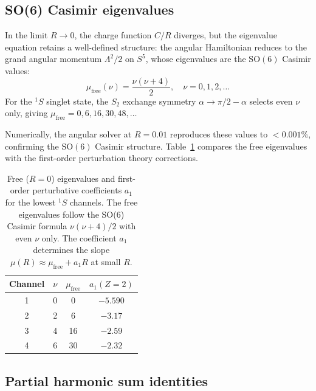 \documentclass[aps,pra,twocolumn,superscriptaddress,longbibliography]{revtex4-2}
\begin{document}
\subsection{SO(6) Casimir eigenvalues}
\label{sec:casimir}

In the limit $R \to 0$, the charge function $C/R$ diverges, but
the eigenvalue equation retains a well-defined structure: the
angular Hamiltonian reduces to the grand angular momentum
$\Lambda^2/2$ on $S^5$, whose eigenvalues are the $\mathrm{SO}(6)$
Casimir values:
\begin{equation}
  \mu_{\mathrm{free}}(\nu) = \frac{\nu(\nu + 4)}{2},
  \quad \nu = 0, 1, 2, \ldots
  \label{eq:mu_free}
\end{equation}
For the ${}^1S$ singlet state, the $S_2$ exchange symmetry
$\alpha \to \pi/2 - \alpha$ selects even $\nu$ only, giving
$\mu_{\mathrm{free}} = 0, 6, 16, 30, 48, \ldots$

Numerically, the angular solver at $R = 0.01$ reproduces these
values to $< 0.001\%$, confirming the $\mathrm{SO}(6)$ Casimir
structure.  Table~\ref{tab:casimir} compares the free eigenvalues
with the first-order perturbation theory corrections.

\begin{table}[h]
\caption{Free ($R = 0$) eigenvalues and first-order perturbative
coefficients $a_1$ for the lowest ${}^1S$ channels.  The free
eigenvalues follow the SO(6) Casimir formula $\nu(\nu+4)/2$ with
even $\nu$ only.  The coefficient $a_1$ determines the slope
$\mu(R) \approx \mu_{\mathrm{free}} + a_1 R$ at small $R$.}
\label{tab:casimir}
\begin{ruledtabular}
\begin{tabular}{cccc}
  Channel & $\nu$ & $\mu_{\mathrm{free}}$ & $a_1(Z{=}2)$ \\
  \hline
  1 & 0 & 0     & $-5.590$ \\
  2 & 2 & 6     & $-3.17$ \\
  3 & 4 & 16    & $-2.59$ \\
  4 & 6 & 30    & $-2.32$ \\
\end{tabular}
\end{ruledtabular}
\end{table}

\subsection{Partial harmonic sum identities}
\label{sec:harmonic_sums}
\end{document}
